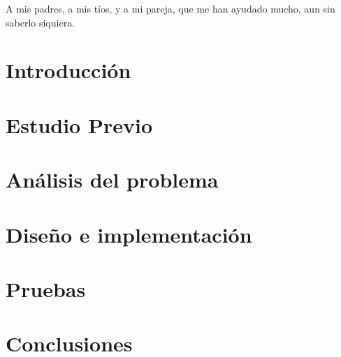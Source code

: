 \documentclass[titlepage,openright,twoside,a4paper,final,12pt,spanish]{book}
\author{Jesús Ruslan Esquinas Herrera}{Grado en Ingeniería Informática - Ingeniería de Computadores}{D.~}{77845636C}
\begin{document}
\makeTitlePage

\pagestyle{empty}
\begin{dedication}
    A mis padres, a mis tíos, y a mi pareja,\break
    que me han ayudado mucho, aun sin saberlo siquiera.
\end{dedication}
\pagestyle{empty}




\tableofcontents
\listoffigures
\listoftables
\newpage



\lineNumbersOn

\part{Introducción}



\part{Estudio Previo}



\part{Análisis del problema}




\part{Diseño e implementación}





\part{Pruebas}



\part{Conclusiones}



\lineNumbersOff


\newpage



\end{document}
